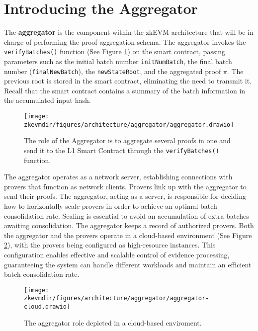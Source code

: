 \section{Introducing the Aggregator}

The \textbf{aggregator} is the component within the zkEVM architecture that will be in charge of performing the proof aggregation schema. The aggregator invokes the \texttt{verifyBatches()} function (See Figure \ref{fig:aggregator}) on the smart contract, passing parameters such as the initial batch number \texttt{initNumBatch}, the final batch number (\texttt{finalNewBatch}), the \texttt{newStateRoot}, and the aggregated proof $\pi$. The previous root is stored in the smart contract, eliminating the need to transmit it. Recall that the smart contract contains a summary of the batch information in the accumulated input hash.


\begin{figure}[h]
\centering
\texttt{[image: \\zkevmdir/figures/architecture/aggregator/aggregator.drawio]}
\caption{The role of the Aggregator is to aggregate several proofs in one and send it to the L1 Smart Contract through the \texttt{verifyBatches()} function.}
\label{fig:aggregator}
\end{figure}

The aggregator operates as a network server, establishing connections with provers that function as network clients. Provers link up with the aggregator to send their proofs. The aggregator, acting as a server, is responsible for deciding how to horizontally scale provers in order to achieve an optimal batch consolidation rate. Scaling is essential to avoid an accumulation of extra batches awaiting consolidation. The aggregator keeps a record of authorized provers. Both the aggregator and the provers operate in a cloud-based environment (See Figure \ref{fig:aggregator-cloud}), with the provers being configured as high-resource instances. This configuration enables effective and scalable control of evidence processing, guaranteeing the system can handle different workloads and maintain an efficient batch consolidation rate.


\begin{figure}[h]
\centering
\texttt{[image: \\zkevmdir/figures/architecture/aggregator/aggregator-cloud.drawio]}
\caption{The aggregator role depicted in a cloud-based enviroment.}
\label{fig:aggregator-cloud}
\end{figure}



